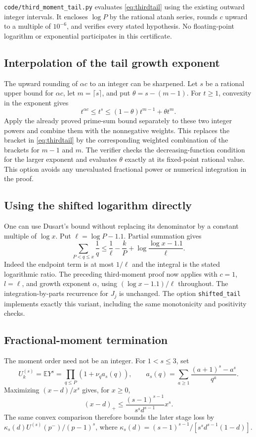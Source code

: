 \documentclass[11pt]{article}
\newcommand{\E}{\mathbb E}
\begin{document}
\texttt{code/third\_moment\_tail.py} evaluates \eqref{eq:thirdtail}
using the existing outward integer intervals. It encloses $\log P$ by
the rational atanh series, rounds $c$ upward to a multiple of $10^{-6}$,
and verifies every stated hypothesis. No floating-point logarithm or
exponential participates in this certificate.

\subsection{Interpolation of the tail growth exponent}
The upward rounding of $\alpha c$ to an integer can be sharpened.
Let $s$ be a rational upper bound for $\alpha c$, let $m=\lceil s\rceil$,
and put $\theta=s-(m-1)$. For $t\geq1$, convexity in the exponent gives
\[
 t^{\alpha c}\leq t^s\leq(1-\theta)t^{m-1}+\theta t^m.
\]
Apply the already proved prime-sum bound separately to these two integer
powers and combine them with the nonnegative weights. This replaces the
bracket in \eqref{eq:thirdtail} by the corresponding weighted combination
of the brackets for $m-1$ and $m$. The verifier checks the decreasing-function
condition for the larger exponent and evaluates $\theta$ exactly at its
fixed-point rational value. This option avoids any unevaluated fractional
power or numerical integration in the proof.

\subsection{Using the shifted logarithm directly}
One can use Dusart's bound without replacing its denominator by a constant
multiple of $\log x$. Put $\ell=\log P-1.1$. Partial summation gives
\[
 \sum_{P<q\leq x}\frac1q
 \leq\frac1\ell-\frac{k}{P}
       +\log\frac{\log x-1.1}{\ell}.
\]
Indeed the endpoint term is at most $1/\ell$ and the integral is the stated
logarithmic ratio. The preceding third-moment proof now applies with
$c=1$, $l=\ell$, and growth exponent $\alpha$, using
$(\log x-1.1)/\ell$ throughout. The integration-by-parts recurrence for
$J_j$ is unchanged. The option \texttt{shifted\_tail} implements exactly
this variant, including the same monotonicity and positivity checks.

\subsection{Fractional-moment termination}\label{sec:fractional}
The moment order need not be an integer. For $1<s\leq3$, set
\[
 U_k^{(s)}=\E Y^s=
 \prod_{q\leq P}\left(1+\nu_q a_s(q)\right),\qquad
 a_s(q)=\sum_{a\geq1}\frac{(a+1)^s-a^s}{q^a}.
\]
Maximizing $(x-d)/x^s$ gives, for $x\geq0$,
\[
 (x-d)_+\leq\frac{(s-1)^{s-1}}{s^s d^{s-1}}x^s.
\]
The same convex comparison therefore bounds the later stage loss by
$\kappa_s(d)U^{(s)}(p^-)/(p-1)^s$, where
$\kappa_s(d)=(s-1)^{s-1}/[s^s d^{s-1}(1-d)]$.
\end{document}

